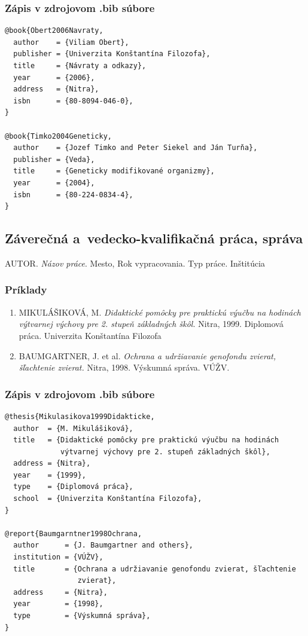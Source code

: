 \subsubsection*{\normalsize Zápis v zdrojovom .bib súbore}
\begin{verbatim}
@book{Obert2006Navraty,
  author    = {Viliam Obert},
  publisher = {Univerzita Konštantína Filozofa},
  title     = {Návraty a odkazy},
  year      = {2006},
  address   = {Nitra},
  isbn      = {80-8094-046-0},
}

@book{Timko2004Geneticky,
  author    = {Jozef Timko and Peter Siekel and Ján Turňa},
  publisher = {Veda},
  title     = {Geneticky modifikované organizmy},
  year      = {2004},
  isbn      = {80-224-0834-4},
}
\end{verbatim}

\subsection{Záverečná a~vedecko-kvalifikačná práca, správa}
AUTOR. \textit{Názov práce}. Mesto, Rok vypracovania. Typ práce. Inštitúcia

\subsubsection*{\normalsize Príklady}
\begin{enumerate}
  \item MIKULÁŠIKOVÁ, M. \textit{Didaktické pomôcky pre praktickú výučbu na hodinách výtvarnej výchovy pre 2. stupeň základných škôl.} Nitra, 1999. Diplomová práca. Univerzita Konštantína Filozofa

  \item BAUMGARTNER, J. et al. \textit{Ochrana a udržiavanie genofondu zvierat, šľachtenie zvierat.} Nitra, 1998. Výskumná správa. VÚŽV.
\end{enumerate}

\subsubsection*{\normalsize Zápis v zdrojovom .bib súbore}
\begin{verbatim}
@thesis{Mikulasikova1999Didakticke,
  author  = {M. Mikulášiková},
  title   = {Didaktické pomôcky pre praktickú výučbu na hodinách
             výtvarnej výchovy pre 2. stupeň základných škôl},
  address = {Nitra},
  year    = {1999},
  type    = {Diplomová práca},
  school  = {Univerzita Konštantína Filozofa},
}

@report{Baumgarntner1998Ochrana,
  author      = {J. Baumgartner and others},
  institution = {VÚŽV},
  title       = {Ochrana a udržiavanie genofondu zvierat, šľachtenie
                 zvierat},
  address     = {Nitra},
  year        = {1998},
  type        = {Výskumná správa},
}
\end{verbatim}

